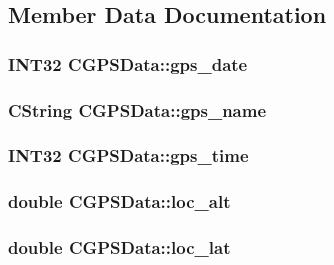 \subsection{Member Data Documentation}
\hypertarget{classCGPSData_a20f13f73b2834db116560dc3067184b5}{
\subsubsection[{gps\_\-date}]{\setlength{\rightskip}{0pt plus 5cm}INT32 {\bf CGPSData::gps\_\-date}}}
\label{classCGPSData_a20f13f73b2834db116560dc3067184b5}
\hypertarget{classCGPSData_af1f3f6f7e4751c48e32a5e62d2d24224}{
\subsubsection[{gps\_\-name}]{\setlength{\rightskip}{0pt plus 5cm}CString {\bf CGPSData::gps\_\-name}}}
\label{classCGPSData_af1f3f6f7e4751c48e32a5e62d2d24224}
\hypertarget{classCGPSData_afb7905ff297607cc06e4846720ef6143}{
\subsubsection[{gps\_\-time}]{\setlength{\rightskip}{0pt plus 5cm}INT32 {\bf CGPSData::gps\_\-time}}}
\label{classCGPSData_afb7905ff297607cc06e4846720ef6143}
\hypertarget{classCGPSData_a6fdeb6174a04d86ee1f007d1db1b9002}{
\subsubsection[{loc\_\-alt}]{\setlength{\rightskip}{0pt plus 5cm}double {\bf CGPSData::loc\_\-alt}}}
\label{classCGPSData_a6fdeb6174a04d86ee1f007d1db1b9002}
\hypertarget{classCGPSData_a06d07f0846f193d39382a68af36a285e}{
\subsubsection[{loc\_\-lat}]{\setlength{\rightskip}{0pt plus 5cm}double {\bf CGPSData::loc\_\-lat}}}
